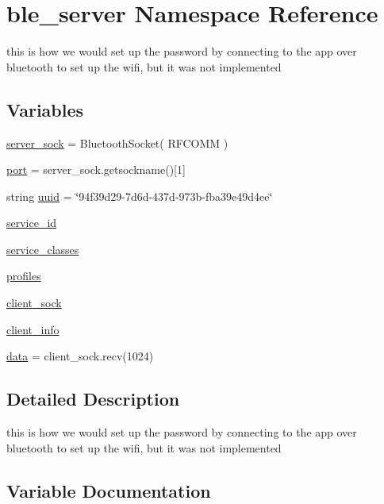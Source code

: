 \hypertarget{namespaceble__server}{}\section{ble\+\_\+server Namespace Reference}
\label{namespaceble__server}


this is how we would set up the password by connecting to the app over bluetooth to set up the wifi, but it was not implemented  


\subsection*{Variables}
\begin{DoxyCompactItemize}
\item 
\hyperlink{namespaceble__server_a012c4fb828b98c127048474e4a42b8a9}{server\+\_\+sock} = Bluetooth\+Socket( R\+F\+C\+O\+MM )
\item 
\hyperlink{namespaceble__server_a582ffc1f83156f429e3286bfb7615451}{port} = server\+\_\+sock.\+getsockname()\mbox{[}1\mbox{]}
\item 
string \hyperlink{namespaceble__server_a9ffa28c0c41fa18acd10b0f25cb58742}{uuid} = \char`\"{}94f39d29-\/7d6d-\/437d-\/973b-\/fba39e49d4ee\char`\"{}
\item 
\hyperlink{namespaceble__server_aa1f1b7fe7a5da29a26dc11bda8638c92}{service\+\_\+id}
\item 
\hyperlink{namespaceble__server_af6bc58768b6933073802b0fb41dbc64f}{service\+\_\+classes}
\item 
\hyperlink{namespaceble__server_a2d3e2a8bcf299004e82715944ce834be}{profiles}
\item 
\hyperlink{namespaceble__server_a71ecdf9c8110f6d61dc146cc669fe0ca}{client\+\_\+sock}
\item 
\hyperlink{namespaceble__server_a3236baccd3b5c2b368e89d2f08a700a0}{client\+\_\+info}
\item 
\hyperlink{namespaceble__server_a2c7e9de6327e3d8b19e89085cb78b708}{data} = client\+\_\+sock.\+recv(1024)
\end{DoxyCompactItemize}


\subsection{Detailed Description}
this is how we would set up the password by connecting to the app over bluetooth to set up the wifi, but it was not implemented 

\subsection{Variable Documentation}
\mbox{\label{namespaceble__server_a3236baccd3b5c2b368e89d2f08a700a0}} 
